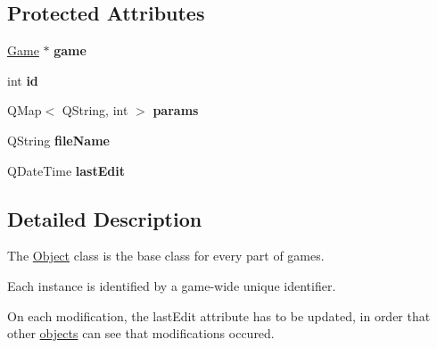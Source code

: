 \subsection*{\-Protected \-Attributes}
\begin{DoxyCompactItemize}
\item 
\hypertarget{class_object_a04630e51809267a79255e0a1ac955ab3}{\hyperlink{class_game}{\-Game} $\ast$ {\bfseries game}}\label{class_object_a04630e51809267a79255e0a1ac955ab3}

\item 
\hypertarget{class_object_aa7caf12457afb8b79152cfaf0158c827}{int {\bfseries id}}\label{class_object_aa7caf12457afb8b79152cfaf0158c827}

\item 
\hypertarget{class_object_af13073ee1a09c15a3a029fa269e07b63}{\-Q\-Map$<$ \-Q\-String, int $>$ {\bfseries params}}\label{class_object_af13073ee1a09c15a3a029fa269e07b63}

\item 
\hypertarget{class_object_aa8324b8446985d4eb1334b3ee69486d7}{\-Q\-String {\bfseries file\-Name}}\label{class_object_aa8324b8446985d4eb1334b3ee69486d7}

\item 
\hypertarget{class_object_a48a973e349405e298059e82f0db4568b}{\-Q\-Date\-Time {\bfseries last\-Edit}}\label{class_object_a48a973e349405e298059e82f0db4568b}

\end{DoxyCompactItemize}


\subsection{\-Detailed \-Description}
\-The \hyperlink{class_object}{\-Object} class is the base class for every part of games. 

\-Each instance is identified by a game-\/wide unique identifier.

\-On each modification, the last\-Edit attribute has to be updated, in order that other \hyperlink{class_object}{objects} can see that modifications occured. 

